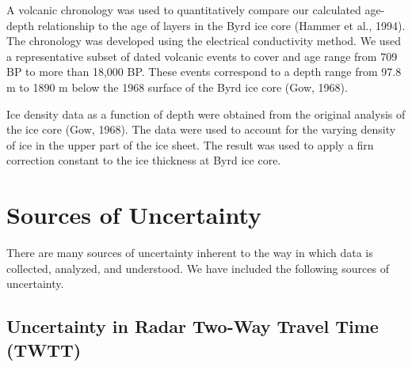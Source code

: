 \documentclass[draft,jgrga]{agutex}
\begin{document}
A volcanic chronology was used to quantitatively compare our calculated age-depth relationship to the age of layers in the Byrd ice core (Hammer et al., 1994). The chronology was developed using the electrical conductivity method. We used a representative subset of dated volcanic events to cover and age range from 709 BP to more than 18,000 BP. These events correspond to a depth range from 97.8 m to 1890 m below the 1968 surface of the Byrd ice core (Gow, 1968).

Ice density data as a function of depth were obtained from the original analysis of the ice core (Gow, 1968). The data were used to account for the varying density of ice in the upper part of the ice sheet. The result was used to apply a firn correction constant to the ice thickness at Byrd ice core. 





\section{Sources of Uncertainty}\label{unc}
There are many sources of uncertainty inherent to the way in which
data is collected, analyzed, and understood. We have included the
following sources of uncertainty.

\subsection{Uncertainty in Radar Two-Way Travel Time (TWTT)}


\end{document}
